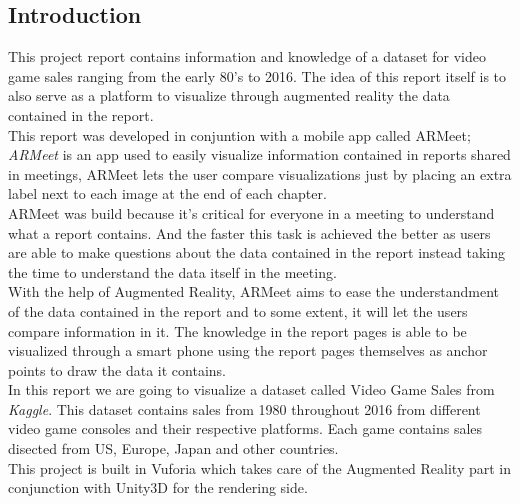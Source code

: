 \subsection*{Introduction} %
This project report contains information and knowledge of a dataset for
video game sales ranging from the early 80's to 2016. The idea of this report
itself is to also serve as a platform to visualize through augmented reality
the data contained in the report.\\

This report was developed in conjuntion with a mobile app called
ARMeet; \textit{ARMeet} is an app used to easily visualize information
contained in reports shared in meetings, ARMeet lets the user compare
visualizations just by placing an extra label next to each image at the end
of each chapter.\\

ARMeet was build because it's critical for everyone in a meeting to understand what a report
contains. And the faster this task is achieved the better as users are able
to make questions about the data contained in the report instead taking the
time to understand the data itself in the meeting.\\

With the help of Augmented Reality, ARMeet aims to ease the understandment of
the data contained in the report and to some extent, it will let the users
compare information in it. The knowledge in the report pages is able to be
visualized through a smart phone using the report pages themselves as anchor
points to draw the data it contains.\\

In this report we are going to visualize a dataset called Video Game Sales from
\textit{Kaggle}\cite{KaggleDataset}. This dataset contains sales from 1980
throughout 2016 from different video game consoles and their respective
platforms. Each game contains sales disected from US, Europe, Japan and other
countries.\\

This project is built in Vuforia\cite{Vuforia} which takes care of the Augmented Reality part in
conjunction with Unity3D\cite{Unity3D} for the rendering side.
\newpage
